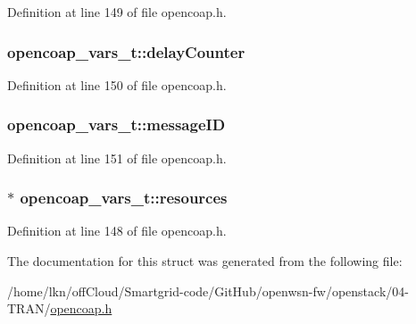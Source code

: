 Definition at line 149 of file opencoap.\+h.

\subsubsection[{\texorpdfstring{delay\+Counter}{delayCounter}}]{ opencoap\+\_\+vars\+\_\+t\+::delay\+Counter}\hypertarget{structopencoap__vars__t_a33a838538c67ff1818a7200bd7eb4479}{}\label{structopencoap__vars__t_a33a838538c67ff1818a7200bd7eb4479}


Definition at line 150 of file opencoap.\+h.

\subsubsection[{\texorpdfstring{message\+ID}{messageID}}]{ opencoap\+\_\+vars\+\_\+t\+::message\+ID}\hypertarget{structopencoap__vars__t_a3328024f36ae1211d6f28386b6b662b2}{}\label{structopencoap__vars__t_a3328024f36ae1211d6f28386b6b662b2}


Definition at line 151 of file opencoap.\+h.

\subsubsection[{\texorpdfstring{resources}{resources}}]{$\ast$ opencoap\+\_\+vars\+\_\+t\+::resources}\hypertarget{structopencoap__vars__t_a63b73eebe78007a9d6bb1e018ed8db45}{}\label{structopencoap__vars__t_a63b73eebe78007a9d6bb1e018ed8db45}


Definition at line 148 of file opencoap.\+h.



The documentation for this struct was generated from the following file\+:\begin{DoxyCompactItemize}
\item 
/home/lkn/off\+Cloud/\+Smartgrid-\/code/\+Git\+Hub/openwsn-\/fw/openstack/04-\/\+T\+R\+A\+N/\hyperlink{opencoap_8h}{opencoap.\+h}\end{DoxyCompactItemize}
